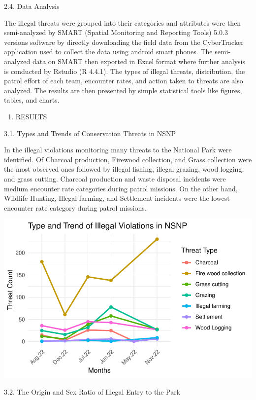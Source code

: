 \documentclass[
  letterpaper,
  DIV=11,
  numbers=noendperiod]{scrartcl}
\providecommand{\tightlist}{%
  \setlength{\itemsep}{0pt}\setlength{\parskip}{0pt}}\usepackage{longtable,booktabs,array}
\begin{document}
2.4. Data Analysis

The illegal threats were grouped into their categories and attributes
were then semi-analyzed by SMART (Spatial Monitoring and Reporting
Tools) 5.0.3 versions software by directly downloading the field data
from the CyberTracker application used to collect the data using android
smart phones. The semi-analyzed data on SMART then exported in Excel
format where further analysis is conducted by Rstudio (R 4.4.1). The
types of illegal threats, distribution, the patrol effort of each team,
encounter rates, and action taken to threats are also analyzed. The
results are then presented by simple statistical tools like figures,
tables, and charts.

\begin{enumerate}
\def\labelenumi{\arabic{enumi}.}
\setcounter{enumi}{2}
\tightlist
\item
  RESULTS
\end{enumerate}

3.1. Types and Trends of Conservation Threats in NSNP

In the illegal violations monitoring many threats to the National Park
were identified. Of Charcoal production, Firewood collection, and Grass
collection were the most observed ones followed by illegal fishing,
illegal grazing, wood logging, and grass cutting. Charcoal production
and waste disposal incidents were medium encounter rate categories
during patrol missions. On the other hand, Wildlife Hunting, Illegal
farming, and Settlement incidents were the lowest encounter rate
category during patrol missions.

\includegraphics{Final_files/figure-pdf/unnamed-chunk-1-1.pdf}

3.2. The Origin and Sex Ratio of Illegal Entry to the Park
\end{document}
